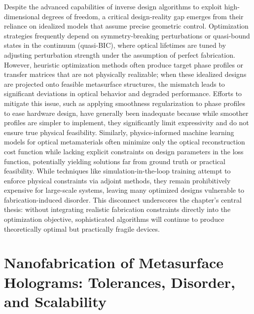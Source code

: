 \documentclass[11pt]{article}
\begin{document}
Despite the advanced capabilities of inverse design algorithms to exploit high-dimensional degrees of freedom, a critical design-reality gap emerges from their reliance on idealized models that assume precise geometric control. Optimization strategies frequently depend on symmetry-breaking perturbations or quasi-bound states in the continuum (quasi-BIC), where optical lifetimes are tuned by adjusting perturbation strength under the assumption of perfect fabrication. However, heuristic optimization methods often produce target phase profiles or transfer matrices that are not physically realizable; when these idealized designs are projected onto feasible metasurface structures, the mismatch leads to significant deviations in optical behavior and degraded performance. Efforts to mitigate this issue, such as applying smoothness regularization to phase profiles to ease hardware design, have generally been inadequate because while smoother profiles are simpler to implement, they significantly limit expressivity and do not ensure true physical feasibility. Similarly, physics-informed machine learning models for optical metamaterials often minimize only the optical reconstruction cost function while lacking explicit constraints on design parameters in the loss function, potentially yielding solutions far from ground truth or practical feasibility. While techniques like simulation-in-the-loop training attempt to enforce physical constraints via adjoint methods, they remain prohibitively expensive for large-scale systems, leaving many optimized designs vulnerable to fabrication-induced disorder. This disconnect underscores the chapter's central thesis: without integrating realistic fabrication constraints directly into the optimization objective, sophisticated algorithms will continue to produce theoretically optimal but practically fragile devices. \citep{doi_10_1103_physrevapplied_21_044004_d1b93ffe} \citep{doi_10_48550_arxiv_2505_18377_a6fc9ec3} \citep{doi_10_1002_adpr_202300158_66d61883}

\section{Nanofabrication of Metasurface Holograms: Tolerances, Disorder, and Scalability}\label{nanofabrication-of-metasurface-holograms-tolerances-disorder-and-scalability}
\end{document}
